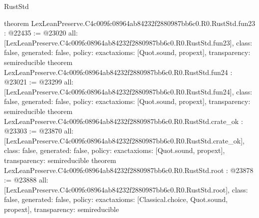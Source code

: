 \begin{lexlean}{RustStd}
\begin{coremodule}
{}
theorem LexLeanPreserve.C4c009fc08964ab84232f2880987bb6c0.R0.RustStd.fun23 : @22435 := @23020 {
  all: [LexLeanPreserve.C4c009fc08964ab84232f2880987bb6c0.R0.RustStd.fun23],
  class: false,
  generated: false,
  policy: exact{axioms: [Quot.sound, propext]},
  transparency: semireducible
}
theorem LexLeanPreserve.C4c009fc08964ab84232f2880987bb6c0.R0.RustStd.fun24 : @23021 := @23299 {
  all: [LexLeanPreserve.C4c009fc08964ab84232f2880987bb6c0.R0.RustStd.fun24],
  class: false,
  generated: false,
  policy: exact{axioms: [Quot.sound, propext]},
  transparency: semireducible
}
theorem LexLeanPreserve.C4c009fc08964ab84232f2880987bb6c0.R0.RustStd.crate_ok : @23303 := @23870 {
  all: [LexLeanPreserve.C4c009fc08964ab84232f2880987bb6c0.R0.RustStd.crate_ok],
  class: false,
  generated: false,
  policy: exact{axioms: [Quot.sound, propext]},
  transparency: semireducible
}
theorem LexLeanPreserve.C4c009fc08964ab84232f2880987bb6c0.R0.RustStd.root : @23878 := @23888 {
  all: [LexLeanPreserve.C4c009fc08964ab84232f2880987bb6c0.R0.RustStd.root],
  class: false,
  generated: false,
  policy: exact{axioms: [Classical.choice, Quot.sound, propext]},
  transparency: semireducible
}


\end{coremodule}
\end{lexlean}
